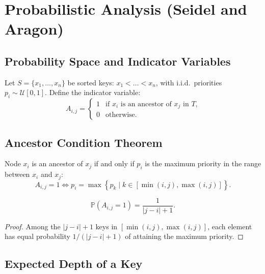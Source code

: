 \FloatBarrier
\section[Probabilistic Analysis]{Probabilistic Analysis (Seidel and Aragon)}
\label{sec:probabilistic-analysis-en}

\subsection{Probability Space and Indicator Variables}
Let $S = \{x_1, \dots, x_n\}$ be sorted keys: $x_1 < \dots < x_n$, with i.i.d.\ priorities $p_i \sim \mathcal{U}[0, 1]$.
Define the indicator variable:
\begin{equation}
  A_{i, j} = \begin{cases}
    1 & \text{if $x_i$ is an ancestor of $x_j$ in $T$,} \\
    0 & \text{otherwise.}
  \end{cases}
\end{equation}

\subsection{Ancestor Condition Theorem}

\begin{theorem}
Node $x_i$ is an ancestor of $x_j$ if and only if $p_i$ is the maximum priority in the range between $x_i$ and $x_j$:
\begin{equation}
  A_{i, j} = 1 \iff p_i = \max \left\{ p_k \mid k \in [\min(i, j), \max(i, j)] \right\}.
\end{equation}
\end{theorem}

\begin{lemma}
\begin{equation}
  \mathbb{P}(A_{i, j} = 1) = \frac{1}{|j - i| + 1}.
\end{equation}
\end{lemma}

\begin{proof}
Among the $|j - i| + 1$ keys in $[\min(i, j), \max(i, j)]$, each element has equal probability $1/(|j - i| + 1)$ of attaining the maximum priority.
\end{proof}

\subsection{Expected Depth of a Key}

